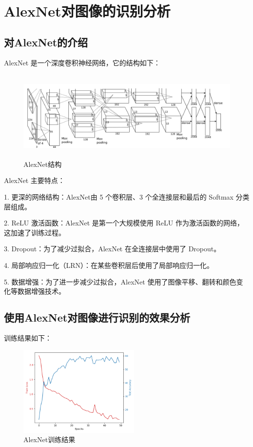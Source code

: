\documentclass[UTF8]{ctexart}
\begin{document}
\section{AlexNet对图像的识别分析}
\subsection{对AlexNet的介绍}
AlexNet 是一个深度卷积神经网络，它的结构如下：\cite{AlexNet}

\begin{figure}[H]
    \centering %
    \includegraphics[height=4.5cm]{../AlexNet/AlexNet_arc.png}
    \caption{AlexNet结构}
\end{figure}

AlexNet 主要特点：\par
1. 更深的网络结构：AlexNet由 5 个卷积层、3 个全连接层和最后的 Softmax 分类层组成。 \par
2. ReLU 激活函数：AlexNet 是第一个大规模使用 ReLU 作为激活函数的网络，这加速了训练过程。 \par
3. Dropout：为了减少过拟合，AlexNet 在全连接层中使用了 Dropout。 \par
4. 局部响应归一化（LRN）：在某些卷积层后使用了局部响应归一化。 \par
5. 数据增强：为了进一步减少过拟合，AlexNet 使用了图像平移、翻转和颜色变化等数据增强技术。 \par

\subsection{使用AlexNet对图像进行识别的效果分析}

训练结果如下：

\begin{figure}[H]
    \centering %
    \includegraphics[height=4.5cm]{../AlexNet/AlexNet.png}
    \caption{AlexNet训练结果}
\end{figure}
\end{document}
